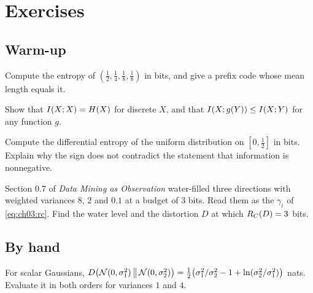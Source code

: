 
\section*{Exercises}

\subsection*{Warm-up}

\begin{exercise}\label{exr:ch03:H}
Compute the entropy of $(\frac12,\frac14,\frac18,\frac18)$ in bits, and give a prefix code whose mean length equals it.
\end{exercise}

\begin{exercise}\label{exr:ch03:function}
Show that $I(X;X)=H(X)$ for discrete $X$, and that $I(X;g(Y))\le I(X;Y)$ for any function $g$.
\end{exercise}

\begin{exercise}\label{exr:ch03:uniform}
Compute the differential entropy of the uniform distribution on $[0,\frac12]$ in bits. Explain why the sign does not contradict the statement that information is nonnegative.
\end{exercise}

\begin{exercise}\label{exr:ch03:ch00}
Section 0.7 of \emph{Data Mining as Observation} water-filled three directions with weighted variances $8$, $2$ and $0.1$ at a budget of $3$ bits. Read them as the $\gamma_i$ of \eqref{eq:ch03:rc}. Find the water level and the distortion $D$ at which $R_C(D)=3$ bits.
\end{exercise}

\subsection*{By hand}

\begin{exercise}\label{exr:ch03:klgauss}
For scalar Gaussians, $D\!\left(\mathcal{N}(0,\sigma_1^2)\,\middle\|\,\mathcal{N}(0,\sigma_2^2)\right)=\frac12\bigl(\sigma_1^2/\sigma_2^2-1+\ln(\sigma_2^2/\sigma_1^2)\bigr)$ nats. Evaluate it in both orders for variances $1$ and $4$.
\end{exercise}

